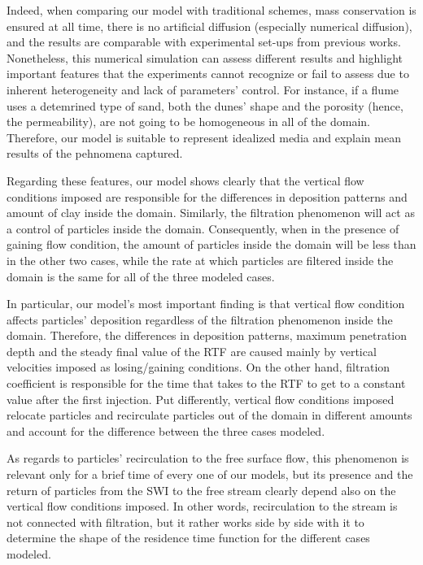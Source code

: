 \documentclass[draft,linenumbers]{agujournal2018}
\begin{document}
Indeed, when comparing our model with traditional schemes, mass conservation is ensured at all time, there is no artificial diffusion (especially numerical diffusion), and the results are comparable with experimental set-ups from previous works. Nonetheless, this numerical simulation can assess different results and highlight important features that the experiments cannot recognize or fail to assess due to inherent heterogeneity and lack of parameters' control. For instance, if a flume uses a detemrined type of sand, both the dunes' shape and the porosity (hence, the permeability), are not going to be homogeneous in all of the domain. Therefore, our model is suitable to represent idealized media and explain mean results of the pehnomena captured. 

Regarding these features, our model shows clearly that the vertical flow conditions imposed are responsible for the differences in deposition patterns and amount of clay inside the domain. Similarly, the filtration phenomenon will act as a control of particles inside the domain. Consequently, when in the presence of gaining flow condition, the amount of particles inside the domain will be less than in the other two cases, while the rate at which particles are filtered inside the domain is the same for all of the three modeled cases.

In particular, our model's most important finding is that vertical flow condition affects particles' deposition regardless of the filtration phenomenon inside the domain. Therefore, the differences in deposition patterns, maximum penetration depth and the steady final value of the RTF are caused mainly by vertical velocities imposed as losing/gaining conditions. On the other hand, filtration coefficient is responsible for the time that takes to the RTF to get to a constant value after the first injection. Put differently, vertical flow conditions imposed relocate particles and recirculate particles out of the domain in different amounts and account for the difference between the three cases modeled.

As regards to particles' recirculation to the free surface flow, this phenomenon is relevant only for a brief time of every one of our models, but its presence and the return of particles from the SWI to the free stream clearly depend also on the vertical flow conditions imposed. In other words, recirculation to the stream is not connected with filtration, but it rather works side by side with it to determine the shape of the residence time function for the different cases modeled. 
\end{document}
